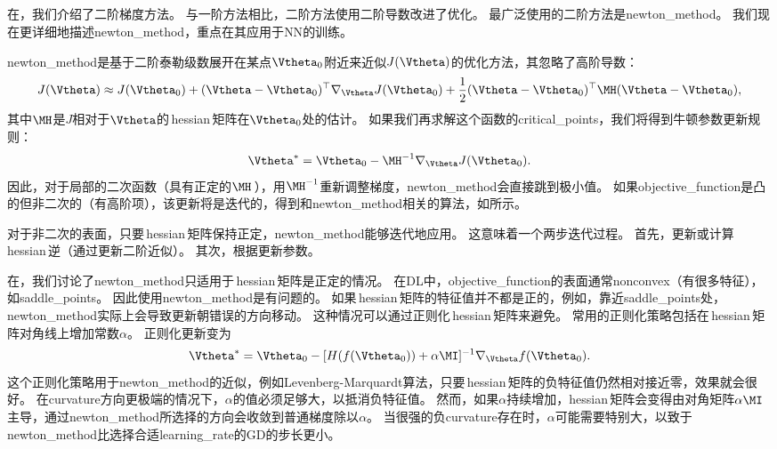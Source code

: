 
\subsection{}
\label{sec:newton_method}
在，我们介绍了二阶梯度方法。
与一阶方法相比，二阶方法使用二阶导数改进了优化。
最广泛使用的二阶方法是\gls{newton_method}。
我们现在更详细地描述\gls{newton_method}，重点在其应用于\gls{NN}的训练。

\gls{newton_method}是基于二阶泰勒级数展开在某点$\Vtheta_0$附近来近似$J(\Vtheta)$的优化方法，其忽略了高阶导数：
\begin{equation}
    J(\Vtheta) \approx J(\Vtheta_0) + (\Vtheta - \Vtheta_0)^\top \nabla_{\Vtheta}   
    J(\Vtheta_0) + \frac{1}{2} (\Vtheta - \Vtheta_0)^\top \MH(\Vtheta - \Vtheta_0),
\end{equation}
其中$\MH$是$J$相对于$\Vtheta$的\,\gls{hessian}\,矩阵在$\Vtheta_0$处的估计。
如果我们再求解这个函数的\gls{critical_points}，我们将得到牛顿参数更新规则：
\begin{equation}
    \Vtheta^* = \Vtheta_0 - \MH^{-1}\nabla_{\Vtheta} J(\Vtheta_0).
\label{eq:8.27}
\end{equation}
因此，对于局部的二次函数（具有正定的$\MH$\,），用$\MH^{-1}$重新调整梯度，\gls{newton_method}会直接跳到极小值。
如果\gls{objective_function}是凸的但非二次的（有高阶项），该更新将是迭代的，得到和\gls{newton_method}相关的算法，如所示。

对于非二次的表面，只要\,\gls{hessian}\,矩阵保持正定，\gls{newton_method}能够迭代地应用。
这意味着一个两步迭代过程。
首先，更新或计算\,\gls{hessian}\,逆（通过更新二阶近似）。
其次，根据更新参数。


在，我们讨论了\gls{newton_method}只适用于\,\gls{hessian}\,矩阵是正定的情况。
在\gls{DL}中，\gls{objective_function}的表面通常\gls{nonconvex}（有很多特征），如\gls{saddle_points}。
因此使用\gls{newton_method}是有问题的。
如果\,\gls{hessian}\,矩阵的特征值并不都是正的，例如，靠近\gls{saddle_points}处，\gls{newton_method}实际上会导致更新朝错误的方向移动。
这种情况可以通过正则化\,\gls{hessian}\,矩阵来避免。
常用的正则化策略包括在\,\gls{hessian}\,矩阵对角线上增加常数$\alpha$。
正则化更新变为
\begin{equation}
    \Vtheta^* = \Vtheta_0 - [ H( f(\Vtheta_0)) + \alpha \MI  ]^{-1} \nabla_{\Vtheta} f(\Vtheta_0).
\end{equation}
这个正则化策略用于\gls{newton_method}的近似，例如Levenberg-Marquardt算法\citep{Levenberg-1944,Marquardt-1963}，只要\,\gls{hessian}\,矩阵的负特征值仍然相对接近零，效果就会很好。
在\gls{curvature}方向更极端的情况下，$\alpha$的值必须足够大，以抵消负特征值。
然而，如果$\alpha$持续增加，\gls{hessian}\,矩阵会变得由对角矩阵$\alpha \MI$主导，通过\gls{newton_method}所选择的方向会收敛到普通梯度除以$\alpha$。
当很强的负\gls{curvature}存在时，$\alpha$可能需要特别大，以致于\gls{newton_method}比选择合适\gls{learning_rate}的\gls{GD}的步长更小。

